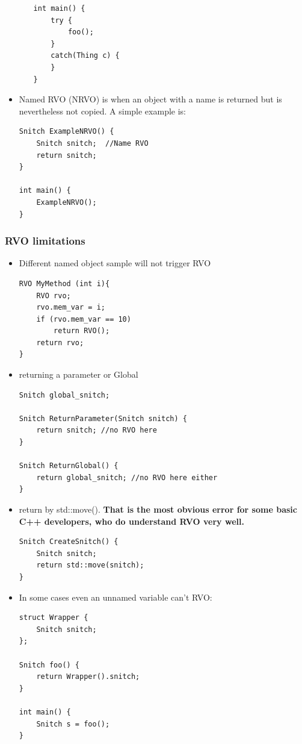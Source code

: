 \documentclass[a4paper,11pt,twoside]{book}
\begin{document}
\begin{itemize}
\begin{enumerate}
\begin{lstlisting}[numbers=none]
int main() {
	try {
		foo();
	}
	catch(Thing c) {  
	}             
}
\end{lstlisting}

	\end{enumerate}

\item Named RVO (NRVO) is when an object with a name is returned but is nevertheless not copied. A simple example is:
\begin{lstlisting}[numbers=none]
Snitch ExampleNRVO() {
	Snitch snitch;  //Name RVO
	return snitch;
}

int main() {
	ExampleNRVO();
}
\end{lstlisting}

\end{itemize}

\subsubsection{RVO limitations}
\begin{itemize}
	\item Different named object sample will not trigger RVO
\begin{lstlisting}[numbers=none]
RVO MyMethod (int i){
	RVO rvo;
	rvo.mem_var = i;
	if (rvo.mem_var == 10)
		return RVO();
	return rvo; 
}
\end{lstlisting}
	
	\item returning a parameter or Global
\begin{lstlisting}[numbers=none]
Snitch global_snitch;

Snitch ReturnParameter(Snitch snitch) {
	return snitch; //no RVO here
}

Snitch ReturnGlobal() {
	return global_snitch; //no RVO here either
}
\end{lstlisting}

\item return by std::move(). \textbf{That is the most obvious error for some basic C++ developers, who do understand RVO very well.} 
\begin{lstlisting}[numbers=none]
Snitch CreateSnitch() {
	Snitch snitch;
	return std::move(snitch);
}
\end{lstlisting}
	
\item In some cases even an unnamed variable can't RVO:
\begin{lstlisting}[numbers=none]
struct Wrapper {
	Snitch snitch;
};

Snitch foo() {
	return Wrapper().snitch;
}

int main() {
	Snitch s = foo();
}
\end{lstlisting}

\end{itemize}
\end{document}
